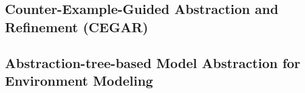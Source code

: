 \subsection{Counter-Example-Guided Abstraction and Refinement (CEGAR)}
\cite{CEGAR}
\subsection{Abstraction-tree-based Model Abstraction for Environment Modeling}



%
%





